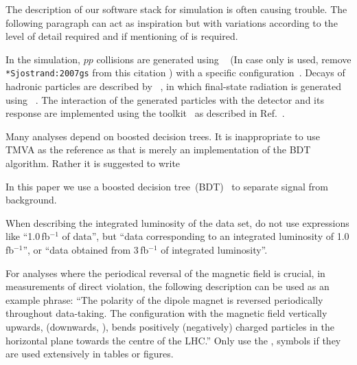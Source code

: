 The description of our software stack for simulation is often
causing trouble. The following paragraph can act as inspiration but
with variations according to the level of detail required and if
mentioning of \eg \photos is required.

In the simulation, $pp$ collisions are generated using
\pythia~\cite{Sjostrand:2006za,*Sjostrand:2007gs} 
(In case only  is used, remove \verb=*Sjostrand:2007gs= from this citation )
 with a specific \lhcb
configuration~\cite{LHCb-PROC-2010-056}.  Decays of hadronic particles
are described by \evtgen~\cite{Lange:2001uf}, in which final-state
radiation is generated using \photos~\cite{Golonka:2005pn}. The
interaction of the generated particles with the detector and its
response are implemented using the \geant
toolkit~\cite{Allison:2006ve, *Agostinelli:2002hh} as described in
Ref.~\cite{LHCb-PROC-2011-006}.

Many analyses depend on boosted decision trees. It is inappropriate to
use TMVA as the reference as that is merely an implementation of the
BDT algorithm. Rather it is suggested to write

In this paper we use a boosted decision tree~(BDT)~\cite{Breiman,AdaBoost} to separate signal from
background.

When describing the integrated luminosity of the data set, do not use
expressions like ``1.0\,fb$^{-1}$ of data'', but \eg 
``data corresponding to an integrated luminosity of 1.0\,fb$^{-1}$'', 
or ``data obtained from 3\,fb$^{-1}$ of integrated luminosity''. 

For analyses where the periodical reversal of the magnetic field is crucial, 
\eg in measurements of direct \CP violation, the following description can be
used as an example phrase: 
``The polarity of the dipole magnet is reversed periodically throughout data-taking.
The configuration with the magnetic field vertically upwards, \MagUp (downwards, \MagDown), bends positively (negatively)
charged particles in the horizontal plane towards the centre of the LHC.''
Only use the \MagUp, \MagDown symbols if they are used extensively in tables or figures.
